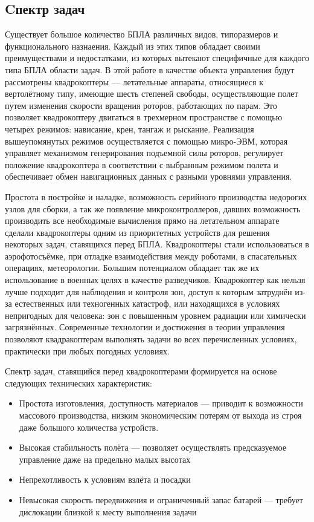 \documentclass[a4paper, 14pt]{extarticle}
\begin{document}
\subsection{Cпектр задач}
Существует большое количество БПЛА
различных видов, типоразмеров и функционального назнаения. Каждый из этих типов обладает своими преимуществами и недостатками, из которых вытекают специфичные для каждого типа БПЛА области задач. В этой работе в качестве объекта управления будут рассмотрены квадрокоптеры — летательные аппараты, относящиеся к вертолётному типу, имеющие шесть степеней свободы,
осуществляющие полет путем изменения скорости вращения роторов,
работающих по парам. Это позволяет квадрокоптеру двигаться в трехмерном
пространстве с помощью четырех режимов: нависание, крен, тангаж и
рыскание. Реализация вышеупомянутых режимов осуществляется с помощью
микро-ЭВМ, которая управляет механизмом генерирования подъемной силы роторов, регулирует положение квадрокоптера в соответствии с выбранным режимом полета и обеспечивает обмен навигационных данных с разными
уровнями управления.  \par 
Простота в постройке и наладке, возможность серийного производства недорогих узлов для сборки, а так же появление микроконтроллеров, давших возможность производить все необходимые вычисления прямо на летательном аппарате сделали квадрокоптеры одним из приоритетных устройств для решения некоторых задач, ставящихся перед БПЛА. Квадрокоптеры стали использоваться в аэрофотосъёмке, при отладке взаимодействия между роботами, в спасательных операциях, метеорологии. Большим потенциалом обладает так же их использование в военных целях в качестве разведчиков. Квадрокоптер как нельзя лучше подходит для наблюдения и контроля зон, доступ к которым затруднён из-за естественных или техногенных катастроф, или находящихся в условиях непригодных для человека: зон с повышенным уровнем радиации или химически загрязнённых. Современные технологии и достижения в теории управления позволяют квадракоптерам выполнять задачи во всех перечисленных условиях, практически при любых погодных условиях. \par
Спектр задач, ставящийся перед квадрокоптерами формируется на основе следующих технических характеристик:
\begin{itemize}
	\item Простота изготовления, доступность материалов — приводит к возможности массового производства, низким экономическим потерям от выхода из строя даже большого количества устройств.
	\item Высокая стабильность полёта — позволяет осуществлять предсказуемое управление даже на предельно малых высотах
	\item Непрехотливость к условиям взлёта и посадки
	\item Невысокая скорость передвижения и ограниченный запас батарей — требует дислокации близкой к месту выполнения задачи
\end{itemize}
\end{document}
